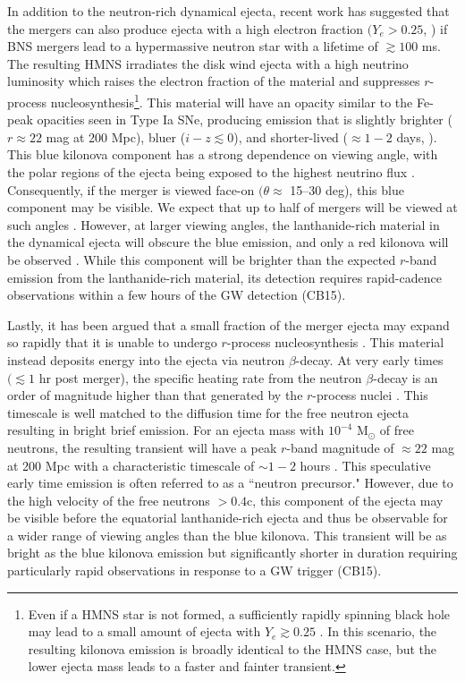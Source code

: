 In addition to the neutron-rich dynamical ejecta, recent work has suggested that the mergers can also produce ejecta with a high electron fraction $(Y_e > 0.25$,  \citealt{wanajo+14,goriely+15}) if BNS mergers lead to a hypermassive neutron star \citep[HMNS; see e.g.,][]{sekiguchi+11} with a lifetime of $\gtrsim 100$ ms. The resulting HMNS irradiates the disk wind ejecta with a high neutrino luminosity which raises the electron fraction of the material and suppresses $r$-process nucleosynthesis\footnote{Even if a HMNS star is not formed, a sufficiently rapidly spinning black hole may lead to a small amount of ejecta with $Y_e \gtrsim 0.25$ \citep[see e.g.,][]{fernandez13,fernandez+15}. In this scenario, the resulting kilonova emission is broadly identical to the HMNS case, but the lower ejecta mass leads to a faster and fainter transient.}. This material will have an opacity similar to the Fe-peak opacities seen in Type Ia SNe, producing emission that is slightly brighter ($r \approx 22$ mag at 200 Mpc), bluer ($i-z \lesssim 0$), and shorter-lived ($\approx 1-2$ days, \citealt{metzger14,kasen+15}). This blue kilonova component has a strong dependence on viewing angle, with the polar regions of the ejecta being exposed to the highest neutrino flux \citep{metzger14,kasen+15}. Consequently, if the merger is viewed face-on $(\theta \approx$ 15--30 deg), this blue component may be visible. We expect that up to half of mergers will be viewed at such angles \citep[see e.g.,][]{metzger12}. However, at larger viewing angles, the lanthanide-rich material in the dynamical ejecta will obscure the blue emission, and only a red kilonova will be observed \citep{kasen+15,metzger17}. While this component will be brighter than the expected $r$-band emission from the lanthanide-rich material, its detection requires rapid-cadence observations within a few hours of the GW detection (CB15).

Lastly, it has been argued that a small fraction of the merger ejecta may expand so rapidly that it is unable to undergo $r$-process nucleosynthesis \citep{bauswein+13}. This material instead deposits energy into the ejecta via neutron $\beta$-decay. At very early times $(\lesssim 1$ hr post merger), the specific heating rate from the neutron $\beta$-decay is an order of magnitude higher than that generated by the $r$-process nuclei \citep{metzger17}. This timescale is well matched to the diffusion time for the free neutron ejecta resulting in bright brief emission. For an ejecta mass with $10^{-4}$ M$_{\odot}$ of free neutrons, the resulting transient will have a peak $r$-band magnitude of $\approx 22$ mag at 200 Mpc with a characteristic timescale of $\sim 1-2$ hours \citep{metzger15}. This speculative early time emission is often referred to as a ``neutron precursor." However, due to the high velocity of the free neutrons $>0.4$c, this component of the ejecta may be visible before the equatorial lanthanide-rich ejecta and thus be observable for a wider range of viewing angles than the blue kilonova. This transient will be as bright as the blue kilonova emission but significantly shorter in duration requiring particularly rapid observations in response to a GW trigger (CB15).

